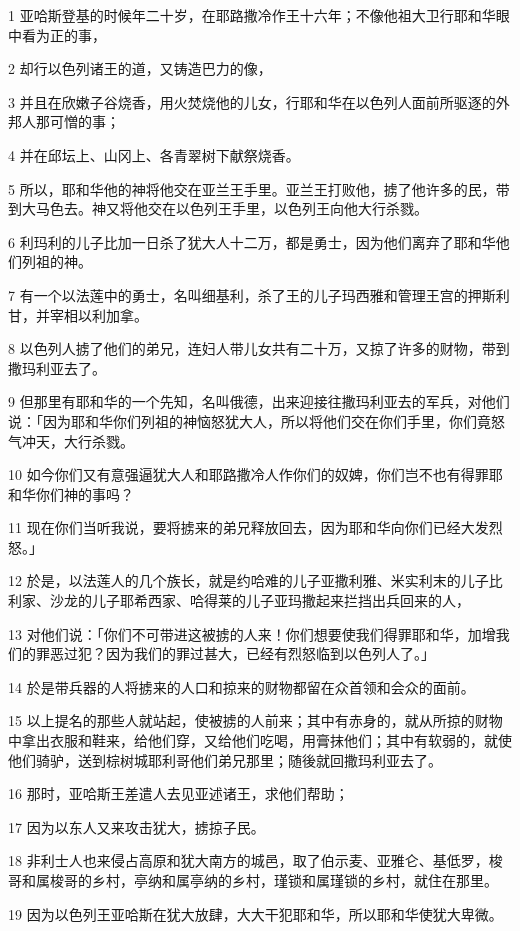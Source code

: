 \par 1 亚哈斯登基的时候年二十岁，在耶路撒冷作王十六年；不像他祖大卫行耶和华眼中看为正的事，
\par 2 却行以色列诸王的道，又铸造巴力的像，
\par 3 并且在欣嫩子谷烧香，用火焚烧他的儿女，行耶和华在以色列人面前所驱逐的外邦人那可憎的事；
\par 4 并在邱坛上、山冈上、各青翠树下献祭烧香。
\par 5 所以，耶和华他的神将他交在亚兰王手里。亚兰王打败他，掳了他许多的民，带到大马色去。神又将他交在以色列王手里，以色列王向他大行杀戮。
\par 6 利玛利的儿子比加一日杀了犹大人十二万，都是勇士，因为他们离弃了耶和华他们列祖的神。
\par 7 有一个以法莲中的勇士，名叫细基利，杀了王的儿子玛西雅和管理王宫的押斯利甘，并宰相以利加拿。
\par 8 以色列人掳了他们的弟兄，连妇人带儿女共有二十万，又掠了许多的财物，带到撒玛利亚去了。
\par 9 但那里有耶和华的一个先知，名叫俄德，出来迎接往撒玛利亚去的军兵，对他们说：「因为耶和华你们列祖的神恼怒犹大人，所以将他们交在你们手里，你们竟怒气冲天，大行杀戮。
\par 10 如今你们又有意强逼犹大人和耶路撒冷人作你们的奴婢，你们岂不也有得罪耶和华你们神的事吗？
\par 11 现在你们当听我说，要将掳来的弟兄释放回去，因为耶和华向你们已经大发烈怒。」
\par 12 於是，以法莲人的几个族长，就是约哈难的儿子亚撒利雅、米实利末的儿子比利家、沙龙的儿子耶希西家、哈得莱的儿子亚玛撒起来拦挡出兵回来的人，
\par 13 对他们说：「你们不可带进这被掳的人来！你们想要使我们得罪耶和华，加增我们的罪恶过犯？因为我们的罪过甚大，已经有烈怒临到以色列人了。」
\par 14 於是带兵器的人将掳来的人口和掠来的财物都留在众首领和会众的面前。
\par 15 以上提名的那些人就站起，使被掳的人前来；其中有赤身的，就从所掠的财物中拿出衣服和鞋来，给他们穿，又给他们吃喝，用膏抹他们；其中有软弱的，就使他们骑驴，送到棕树城耶利哥他们弟兄那里；随後就回撒玛利亚去了。
\par 16 那时，亚哈斯王差遣人去见亚述诸王，求他们帮助；
\par 17 因为以东人又来攻击犹大，掳掠子民。
\par 18 非利士人也来侵占高原和犹大南方的城邑，取了伯示麦、亚雅仑、基低罗，梭哥和属梭哥的乡村，亭纳和属亭纳的乡村，瑾锁和属瑾锁的乡村，就住在那里。
\par 19 因为以色列王亚哈斯在犹大放肆，大大干犯耶和华，所以耶和华使犹大卑微。
